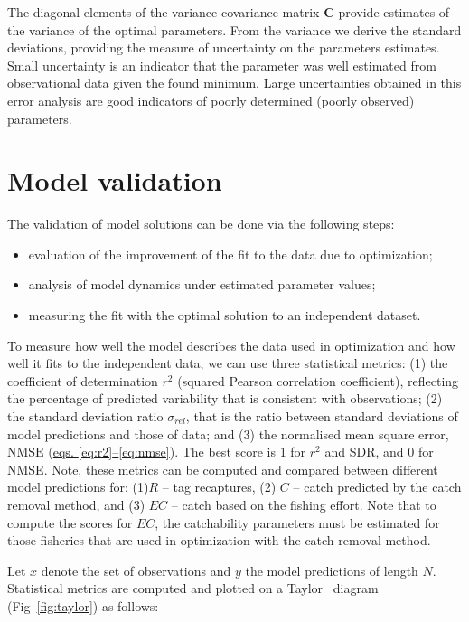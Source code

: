 The diagonal elements of the variance-covariance matrix $\mathbf{C}$ provide estimates of the variance of the optimal parameters. From the variance we derive the standard deviations, providing the measure of uncertainty on the parameters estimates. Small uncertainty is an indicator that the parameter was well estimated from observational data given the found minimum. Large uncertainties obtained in this error analysis are good indicators of poorly determined (poorly observed) parameters. \\

\section{Model validation}\label{sec:validation}

The validation of model solutions can be done via the following steps:

\begin{itemize}
\item evaluation of the improvement of the fit to the data due to optimization; 
\item analysis of model dynamics under estimated parameter values; 
\item measuring the fit with the optimal solution to an independent dataset. 
\end{itemize}

To measure how well the model describes the data used in optimization and how well it fits to the independent data, we can use three statistical metrics:  (1) the coefficient of determination $r^2$ (squared Pearson correlation coefficient), reflecting the percentage of predicted variability that is consistent with observations; (2) the standard deviation ratio $\sigma_{rel}$, that is the ratio between standard deviations of model predictions and those of data; and (3) the normalised mean square error, $\text{NMSE}$ (\hyperref[eq:r2]{eqs. \ref*{eq:r2}--\ref*{eq:nmse}}). The best score is 1 for $r^2$ and SDR, and 0 for NMSE. Note, these metrics can be computed and compared between different model predictions for: (1)$R$ -- tag recaptures, (2) $C$ -- catch predicted by the catch removal method, and (3) $EC$ -- catch based on the fishing effort. Note that to compute the scores for $EC$, the catchability parameters must be estimated for those fisheries that are used in optimization with the catch removal method.

Let $x$ denote the set of observations and $y$ the model predictions of length $N$. Statistical metrics are computed and plotted on a Taylor~\citep{Taylor} diagram (Fig~\ref{fig:taylor}) as follows:

